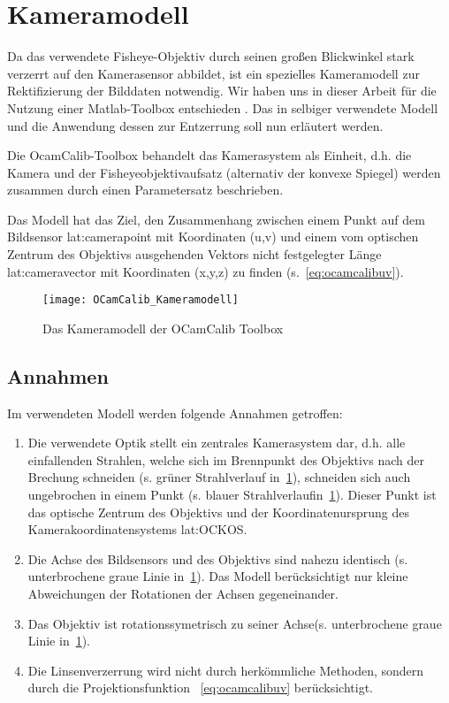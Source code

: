 \section{Kameramodell} \label{sec:kameramodell}
Da das verwendete Fisheye-Objektiv durch seinen großen Blickwinkel stark verzerrt auf den Kamerasensor abbildet, ist ein spezielles Kameramodell zur Rektifizierung der Bilddaten notwendig. Wir haben uns in dieser Arbeit für die Nutzung einer Matlab-Toolbox entschieden  \autocite{OCamCalibOmnidirectionalCamera, scaramuzzaFlexibleTechniqueAccurate2006, scaramuzzaToolboxEasilyCalibrating2006, scaramuzzaOmnidirectionalVisionCalibration2007, rufliAutomaticDetectionCheckerboards2008}. Das in selbiger verwendete Modell und die Anwendung dessen zur Entzerrung soll nun erläutert werden. 

Die OcamCalib-Toolbox behandelt das Kamerasystem als Einheit, d.h. die Kamera und der Fisheyeobjektivaufsatz (alternativ der konvexe Spiegel) werden zusammen durch einen Parametersatz beschrieben.

Das Modell hat das Ziel, den Zusammenhang zwischen einem Punkt auf dem Bildsensor \gls{lat:camerapoint} mit Koordinaten (u,v) und einem vom optischen Zentrum des Objektivs ausgehenden Vektors nicht festgelegter Länge \gls{lat:cameravector} mit Koordinaten (x,y,z) zu finden (s.~\eqref{eq:ocamcalibuv}).

\begin{figure}[H]
  \centering
  \texttt{[image: OCamCalib\_Kameramodell]}
  \caption{Das Kameramodell der OCamCalib Toolbox}
  \label{fig:kameramodell}
\end{figure}

\subsection{Annahmen}
Im verwendeten Modell werden folgende Annahmen getroffen:
\begin{enumerate}
\item Die verwendete Optik stellt ein zentrales Kamerasystem dar, d.h. alle einfallenden Strahlen, welche sich im Brennpunkt des Objektivs nach der Brechung schneiden (s. grüner Strahlverlauf in~\ref{fig:kameramodell}), schneiden sich auch ungebrochen in einem Punkt (s. blauer Strahlverlaufin~\ref{fig:kameramodell}). Dieser Punkt ist das optische Zentrum des Objektivs und der Koordinatenursprung des Kamerakoordinatensystems \gls{lat:OCKOS}.
\item \label{item:ocamcalibassm2} Die Achse des Bildsensors und des Objektivs sind nahezu identisch (s. unterbrochene graue Linie in~\ref{fig:kameramodell}). Das Modell berücksichtigt nur kleine Abweichungen der Rotationen der Achsen gegeneinander.
\item Das Objektiv ist rotationssymetrisch zu seiner Achse(s. unterbrochene graue Linie in~\ref{fig:kameramodell}).
\item Die Linsenverzerrung wird nicht durch herkömmliche Methoden, sondern durch die Projektionsfunktion ~\eqref{eq:ocamcalibuv} berücksichtigt.
\end{enumerate}


